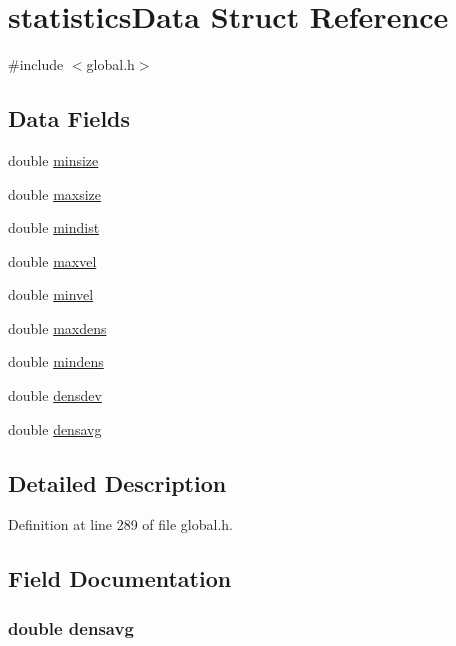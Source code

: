 \hypertarget{structstatisticsData}{\section{statistics\-Data Struct Reference}
\label{structstatisticsData}
}


{\ttfamily \#include $<$global.\-h$>$}

\subsection*{Data Fields}
\begin{DoxyCompactItemize}
\item 
double \hyperlink{structstatisticsData_ad99dc4104d1898b6e593bbf331e41c69}{minsize}
\item 
double \hyperlink{structstatisticsData_a7383c898fd4cd4d862ca65d3713086cd}{maxsize}
\item 
double \hyperlink{structstatisticsData_a78455d23ec97258967b76cbb2332b7be}{mindist}
\item 
double \hyperlink{structstatisticsData_a485292d20f5d14bd18e83fef65976fb4}{maxvel}
\item 
double \hyperlink{structstatisticsData_a1b9d00ac67b4ceca8e7747a50edc802b}{minvel}
\item 
double \hyperlink{structstatisticsData_abc8b83844f3405d9046189aa841b48fd}{maxdens}
\item 
double \hyperlink{structstatisticsData_a2ddb05b9ae611dab07eef62db427ed61}{mindens}
\item 
double \hyperlink{structstatisticsData_a62a3935a35dda8e375bf0ec6cc160d5e}{densdev}
\item 
double \hyperlink{structstatisticsData_ae897d6b29710ca63a31e17866c73bc9a}{densavg}
\end{DoxyCompactItemize}


\subsection{Detailed Description}


Definition at line 289 of file global.\-h.



\subsection{Field Documentation}
\hypertarget{structstatisticsData_ae897d6b29710ca63a31e17866c73bc9a}{
\subsubsection[{densavg}]{\setlength{\rightskip}{0pt plus 5cm}double densavg}}\label{structstatisticsData_ae897d6b29710ca63a31e17866c73bc9a}


